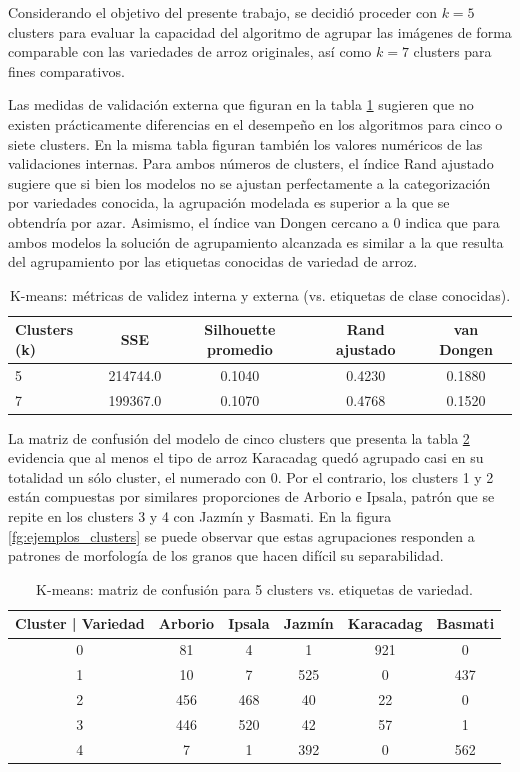 \documentclass{article}
\begin{document}
Considerando el objetivo del presente trabajo, se decidió proceder con \(k = 5\) clusters para evaluar la capacidad del algoritmo de agrupar las imágenes de forma comparable con las variedades de arroz originales, así como \(k = 7\) clusters para fines comparativos. 

Las medidas de validación externa que figuran en la tabla \ref{tab:kmeans} sugieren que no existen prácticamente diferencias en el desempeño en los algoritmos para cinco o siete clusters.
En la misma tabla figuran también los valores numéricos de las validaciones internas.
Para ambos números de clusters, el índice Rand ajustado sugiere que si bien los modelos no se ajustan perfectamente a la categorización por variedades conocida, la agrupación modelada es superior a la que se obtendría por azar.
Asimismo, el índice van Dongen cercano a 0 indica que para ambos modelos la solución de agrupamiento alcanzada es similar a la que resulta del agrupamiento por las etiquetas conocidas de variedad de arroz.

\begin{table}[!htb]
  \centering
  \begin{tabular}{lcccc}
    \toprule
    Clusters (k) & SSE & Silhouette promedio & Rand ajustado & van Dongen\\
    \midrule
    5 &  214744.0 &  0.1040&  0.4230& 0.1880\\ 
    7 &  199367.0&  0.1070&  0.4768& 0.1520\\
    \bottomrule
  \end{tabular}
  \caption{K-means: métricas de validez interna y externa (vs. etiquetas de clase conocidas).}
  \label{tab:kmeans}
\end{table}

La matriz de confusión del modelo de cinco clusters que presenta la tabla \ref{tab:mc_kmeans5} evidencia que al menos el tipo de arroz Karacadag quedó agrupado casi en su totalidad un sólo cluster, el numerado con 0. 
Por el contrario, los clusters 1 y 2 están compuestas por similares proporciones de Arborio e Ipsala, patrón que se repite en los clusters 3 y 4 con Jazmín y Basmati.
En la figura \ref{fg:ejemplos_clusters} se puede observar que estas agrupaciones responden a patrones de morfología de los granos que hacen difícil su separabilidad.

\begin{table}[!htb]
    \centering
    \begin{tabular}{cccccc}
    \toprule
    Cluster | Variedad &  Arborio &  Ipsala &  Jazmín &  Karacadag & Basmati\\
    \midrule
    0 & 81 & 4& 1 & 921 & 0 \\
    1 & 10 & 7& 525 & 0 & 437 \\
    2 & 456 & 468 & 40 & 22& 0 \\
    3 & 446 & 520 & 42 & 57& 1 \\
    4 & 7 & 1 & 392 & 0 & 562 \\
    \bottomrule
    \end{tabular}
    \caption{K-means: matriz de confusión para 5 clusters vs. etiquetas de variedad.}
    \label{tab:mc_kmeans5}
\end{table}
\end{document}
